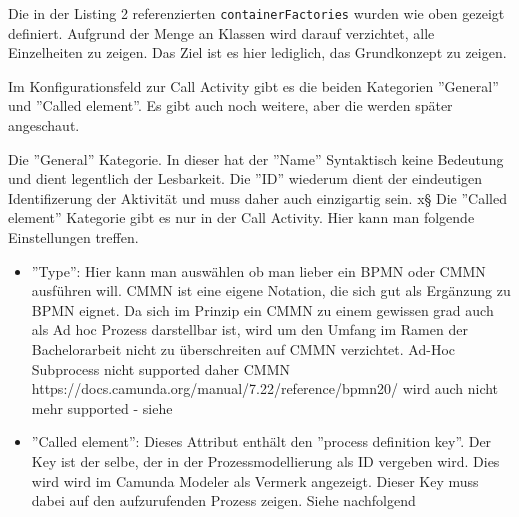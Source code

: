 Die in der Listing 2 referenzierten \lstinline{containerFactories} wurden wie oben gezeigt definiert. Aufgrund der Menge an Klassen wird darauf verzichtet, alle Einzelheiten zu zeigen. Das Ziel ist es hier lediglich, das Grundkonzept zu zeigen.



Im Konfigurationsfeld zur Call Activity gibt es die beiden Kategorien ''General'' und ''Called element''. Es gibt auch noch weitere, aber die werden später angeschaut. 

Die ''General'' Kategorie. In dieser hat der ''Name'' Syntaktisch keine Bedeutung und dient legentlich der Lesbarkeit. Die ''ID'' wiederum dient der eindeutigen Identifizerung der Aktivität und muss daher auch einzigartig sein.
x§
Die ''Called element'' Kategorie gibt es nur in der Call Activity. Hier kann man folgende Einstellungen treffen.

\begin{itemize}
    \item ''Type'': Hier kann man auswählen ob man lieber ein \acs{BPMN} oder \acs{CMMN} ausführen will. \acs{CMMN} ist eine eigene Notation, die sich gut als Ergänzung zu \acs{BPMN} eignet. Da sich im Prinzip ein CMMN zu einem gewissen grad auch als Ad hoc Prozess darstellbar ist, wird um den Umfang im Ramen der Bachelorarbeit nicht zu überschreiten auf \acs{CMMN} verzichtet. Ad-Hoc Subprocess nicht supported daher CMMN
    https://docs.camunda.org/manual/7.22/reference/bpmn20/
    wird auch nicht mehr supported - siehe
    \item ''Called element'': Dieses Attribut enthält den ''process definition key''. Der Key ist der selbe, der in der Prozessmodellierung als ID vergeben wird. Dies wird wird im 
    Camunda Modeler als Vermerk angezeigt. Dieser Key muss dabei auf den aufzurufenden Prozess zeigen. Siehe nachfolgend
\end{itemize}
\clearpage
{}


